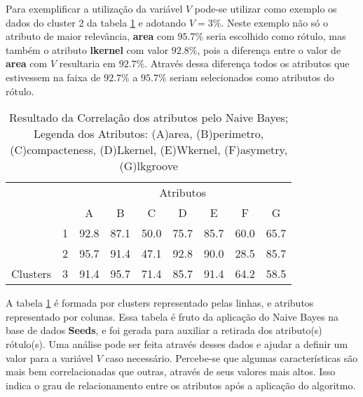 Para exemplificar a utilização da variável ${V}$ pode-se utilizar como exemplo os dados do cluster 2 da tabela \ref{tab:matrelevancia:seeds:nb} e adotando ${V=3\%}$.  Neste exemplo não só o atributo de maior relevância, \textbf{area} com ${95.7\%}$ seria escolhido como rótulo, mas também o atributo \textbf{lkernel} com valor ${92.8\%}$, pois a diferença entre o valor de \textbf{area} com ${V}$ resultaria em ${92.7\%}$. Através dessa diferença todos os atributos que estivessem na faixa de ${92.7\%}$ a  ${95.7\%}$ seriam selecionados como atributos do rótulo.

\begin{table}[!h]
    
    \caption{Resultado da Correlação dos atributos pelo Naive Bayes; Legenda dos Atributos: (A)area, (B)perimetro, (C)compacteness, (D)Lkernel, (E)Wkernel, (F)asymetry, (G)lkgroove}    
    \centering
   \small\addtolength{\tabcolsep}{+2pt}
    \begin{tabular}{|cl|c|c|c|c|c|c|c|}
        \hline \hline
                                &   & \multicolumn{7}{c|}{Atributos}          \\ \cline{3-9} 
        \multicolumn{1}{|l}{}                            &   & A    & B & C & D & E & F & G \\ \hline
        \multicolumn{1}{|c|}{}                           & 1 & 92.8 & 87.1   & 50.0      & 75.7 & 85.7 & 60.0   & 65.7   \\ \cline{2-9} 
        \multicolumn{1}{|c|}{}                           & 2 & 95.7 & 91.4   & 47.1      & 92.8 & 90.0 & 28.5  & 85.7  \\ \cline{2-9} 
        \multicolumn{1}{|c|}{\multirow{-3}{*}{Clusters}} & 3 & 91.4 & 95.7   & 71.4      & 85.7 & 91.4 & 64.2  & 58.5  \\ \hline
    \end{tabular}
    \label{tab:matrelevancia:seeds:nb} 
\end{table}

A tabela \ref{tab:matrelevancia:seeds:nb} é formada por clusters representado pelas linhas, e atributos representado por colunas. Essa tabela é fruto da aplicação do Naive Bayes na base de dados \textbf{Seeds}, e foi  gerada para auxiliar a retirada dos atributo(s) rótulo(s). Uma análise pode ser feita através desses dados e ajudar a definir um valor para a variável ${V}$ caso necessário. Percebe-se que algumas características são mais bem correlacionadas que  outras, através de seus valores mais altos. Isso indica o grau de relacionamento entre os atributos após a aplicação do algoritmo. 


